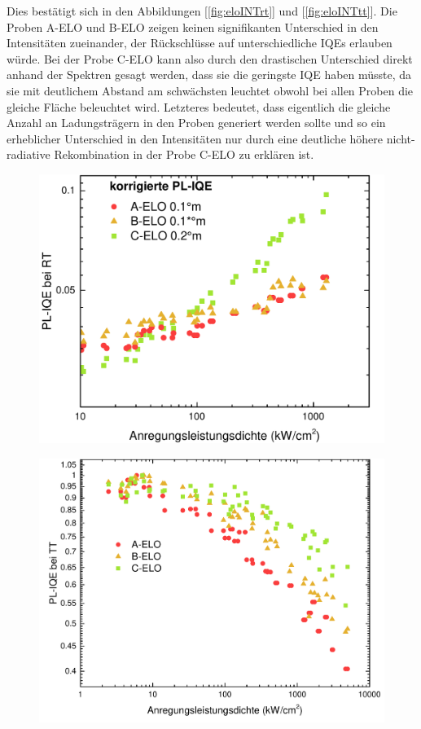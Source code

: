 \noindent 
% 
Dies bestätigt sich in den Abbildungen [\ref{fig:eloINTrt}] und [\ref{fig:eloINTtt}]. Die Proben A-ELO und B-ELO zeigen keinen signifikanten Unterschied in den Intensitäten zueinander, der Rückschlüsse auf unterschiedliche IQEs erlauben würde.  Bei der Probe C-ELO kann also durch den drastischen Unterschied direkt anhand der Spektren gesagt werden, dass sie die geringste IQE haben müsste, da sie mit deutlichem Abstand am schwächsten leuchtet obwohl bei allen Proben die gleiche Fläche beleuchtet wird. Letzteres bedeutet, dass eigentlich die gleiche Anzahl an Ladungsträgern in den Proben generiert werden sollte und so ein erheblicher Unterschied in den Intensitäten nur durch eine deutliche höhere nicht-radiative Rekombination in der Probe C-ELO zu erklären ist.
%
\begin{figure}[H]
  \centering
  \begin{minipage}[t]{0.49\textwidth}
    \centering
    \includegraphics[width=\textwidth]{Bilder/TS4045/corrIQERT.pdf}
    \label{fig:eloiqeRT}
  \end{minipage}
	\hfill
  \begin{minipage}[t]{0.49\textwidth}
    \centering
    \includegraphics[width=\linewidth]{Bilder/TS4045/IQETT.pdf}

\end{minipage}
\end{figure}
